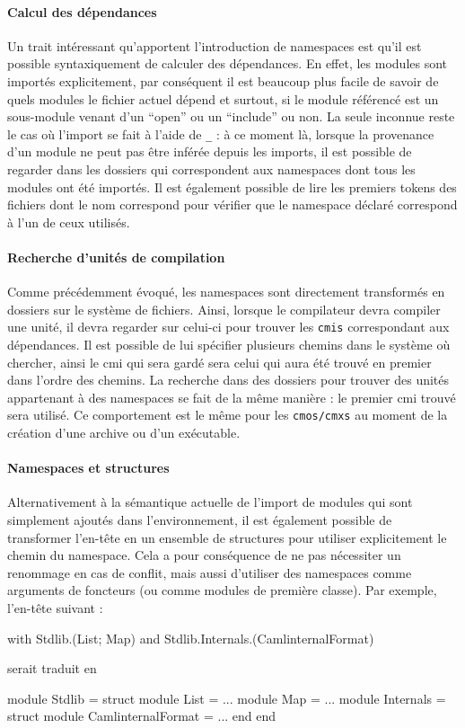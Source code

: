 \documentclass[11pt,a4paper]{report}
\begin{document}
\paragraph{Calcul des dépendances}

Un trait intéressant qu'apportent l'introduction de namespaces est qu'il est
possible syntaxiquement de calculer des dépendances. En effet, les modules sont
importés explicitement, par conséquent il est beaucoup plus facile de savoir de
quels modules le fichier actuel dépend et surtout, si le module référencé est un
sous-module venant d'un ``open'' ou un ``include'' ou non. La seule inconnue
reste le cas où l'import se fait à l'aide de \texttt{_} : à ce moment là,
lorsque la provenance d'un module ne peut pas être inférée depuis les imports,
il est possible de regarder dans les dossiers qui correspondent aux namespaces
dont tous les modules ont été importés. Il est également possible de lire les
premiers tokens des fichiers dont le nom correspond pour vérifier que le
namespace déclaré correspond à l'un de ceux utilisés.

\paragraph{Recherche d'unités de compilation}

Comme précédemment évoqué, les namespaces sont directement transformés en
dossiers sur le système de fichiers. Ainsi, lorsque le compilateur devra
compiler une unité, il devra regarder sur celui-ci pour trouver les
\texttt{cmis} correspondant aux dépendances. Il est possible de lui spécifier
plusieurs chemins dans le système où chercher, ainsi le cmi qui sera gardé sera
celui qui aura été trouvé en premier dans l'ordre des chemins. La recherche dans
des dossiers pour trouver des unités appartenant à des namespaces se fait de la
même manière : le premier cmi trouvé sera utilisé. Ce comportement est le même
pour les \texttt{cmos/cmxs} au moment de la création d'une archive ou d'un
exécutable.

\paragraph{Namespaces et structures}

Alternativement à la sémantique actuelle de l'import de modules qui sont
simplement ajoutés dans l'environnement, il est également possible de
transformer l'en-tête en un ensemble de structures pour utiliser explicitement le
chemin du namespace. Cela a pour conséquence de ne pas nécessiter un renommage
en cas de conflit, mais aussi d'utiliser des namespaces comme arguments de
foncteurs (ou comme modules de première classe). Par exemple, l'en-tête suivant
:
\begin{OCaml}
with Stdlib.(List; Map)
and Stdlib.Internals.(CamlinternalFormat)
\end{OCaml}
serait traduit en
\begin{OCaml}
module Stdlib =
  struct
    module List = ...
    module Map = ...
    module Internals =
      struct
        module CamlinternalFormat = ...
      end
  end
\end{OCaml}
\end{document}
